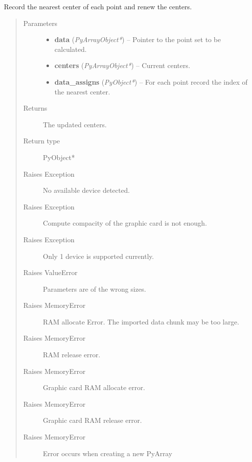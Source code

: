\documentclass[letterpaper,10pt,english]{sphinxmanual}
\begin{document}

\begin{fulllineitems}
\label{kmeans:c.kmeans_chunk_center_cuda}
Record the nearest center of each point and renew the centers.
\begin{quote}\begin{description}
\item[{Parameters}] \leavevmode\begin{itemize}
\item {} 
\textbf{data} (\emph{PyArrayObject*}) -- Pointer to the point set to be calculated.

\item {} 
\textbf{centers} (\emph{PyArrayObject*}) -- Current centers.

\item {} 
\textbf{data\_assigns} (\emph{PyObject*}) -- For each point record the index of the nearest center.

\end{itemize}

\item[{Returns}] \leavevmode
The updated centers.

\item[{Return type}] \leavevmode
PyObject*

\item[{Raises Exception}] \leavevmode
No available device detected.

\item[{Raises Exception}] \leavevmode
Compute compacity of the graphic card is not enough.

\item[{Raises Exception}] \leavevmode
Only 1 device is supported currently.

\item[{Raises ValueError}] \leavevmode
Parameters are of the wrong sizes.

\item[{Raises MemoryError}] \leavevmode
RAM allocate Error. The imported data chunk may be too large.

\item[{Raises MemoryError}] \leavevmode
RAM release error.

\item[{Raises MemoryError}] \leavevmode
Graphic card RAM allocate error.

\item[{Raises MemoryError}] \leavevmode
Graphic card RAM release error.

\item[{Raises MemoryError}] \leavevmode
Error occurs when creating a new PyArray

\end{description}\end{quote}

\end{fulllineitems}
\end{document}
